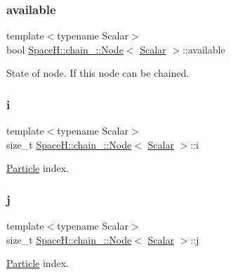 \subsubsection{\texorpdfstring{available}{available}}
{\footnotesize\ttfamily template$<$typename Scalar$>$ \\
bool \mbox{\hyperlink{struct_space_h_1_1chain_1_1_node}{Space\+H\+::chain_\+::\+Node}}$<$ \mbox{\hyperlink{create_kepler_8cpp_a8c2981f3f834be9448a6ab06c28748eb}{Scalar}} $>$\+::available}

State of node. If this node can be chained. \mbox{\label{struct_space_h_1_1chain_1_1_node_ac3784f544e43740ba9496a821b1818eb}} 
\subsubsection{\texorpdfstring{i}{i}}
{\footnotesize\ttfamily template$<$typename Scalar$>$ \\
size\+\_\+t \mbox{\hyperlink{struct_space_h_1_1chain_1_1_node}{Space\+H\+::chain_\+::\+Node}}$<$ \mbox{\hyperlink{create_kepler_8cpp_a8c2981f3f834be9448a6ab06c28748eb}{Scalar}} $>$\+::i}

\mbox{\hyperlink{struct_space_h_1_1_particle}{Particle}} index. \mbox{\label{struct_space_h_1_1chain_1_1_node_a7e0bcb5270769de3d49ee981241b027c}} 
\subsubsection{\texorpdfstring{j}{j}}
{\footnotesize\ttfamily template$<$typename Scalar$>$ \\
size\+\_\+t \mbox{\hyperlink{struct_space_h_1_1chain_1_1_node}{Space\+H\+::chain_\+::\+Node}}$<$ \mbox{\hyperlink{create_kepler_8cpp_a8c2981f3f834be9448a6ab06c28748eb}{Scalar}} $>$\+::j}

\mbox{\hyperlink{struct_space_h_1_1_particle}{Particle}} index. \mbox{\label{struct_space_h_1_1chain_1_1_node_aea525d23b6c16acd3e2c186d36327f92}} 
